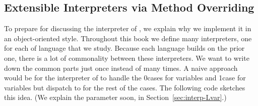 \documentclass[7x10,nocrop]{TimesAPriori_MIT}%
\def\racketEd{0}
\def\pythonEd{1}
\def\edition{1}
\newcommand{\racket}[1]{{\if\edition\racketEd{#1}\fi}}
\newcommand{\python}[1]{{\if\edition\pythonEd #1\fi}}
\begin{document}
\subsection{Extensible Interpreters via Method Overriding}
\label{sec:extensible-interp}

To prepare for discussing the interpreter of \LangVar{}, we explain
why we implement it in an object-oriented style. Throughout this book
we define many interpreters, one for each of language that we
study. Because each language builds on the prior one, there is a lot
of commonality between these interpreters. We want to write down the
common parts just once instead of many times. A naive approach would
be for the interpreter of \LangVar{} to handle the
\racket{cases for variables and }
\python{case for variables}
but dispatch to \LangInt{}
for the rest of the cases. The following code sketches this idea. (We
explain the  parameter soon, in
Section~\ref{sec:interp-Lvar}.)
\end{document}
